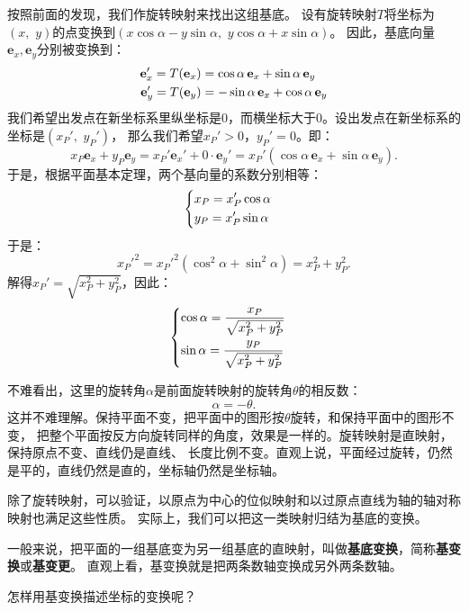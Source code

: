 \documentclass[12pt,UTF8]{ctexbook}
\begin{document}
按照前面的发现，我们作旋转映射来找出这组基底。
设有旋转映射$T$将坐标为$(x,\,\, y)$的点变换到$(x\cos{\alpha} - y\sin{\alpha},\,\,y\cos{\alpha} + x\sin{\alpha})$。
因此，基底向量$\mathbf{e}_x, \mathbf{e}_y$分别被变换到：
\begin{align}
    \mathbf{e}_x' = T(\mathbf{e}_x) &= \cos{\alpha}\,\mathbf{e}_x + \sin{\alpha}\,\mathbf{e}_y \notag \\
    \mathbf{e}_y' = T(\mathbf{e}_y) &= -\sin{\alpha}\,\mathbf{e}_x + \cos{\alpha}\,\mathbf{e}_y \notag 
\end{align}
我们希望出发点在新坐标系里纵坐标是$0$，而横坐标大于$0$。设出发点在新坐标系的坐标是$(x_P', \,\, y_P')$，
那么我们希望$x_P' > 0$，$y_P' = 0$。即：
$$ x_P\mathbf{e}_x + y_P\mathbf{e}_y = x_P' \mathbf{e}_x' + 0 \cdot \mathbf{e}_y' = x_P' (\cos{\alpha}\,\mathbf{e}_x + \sin{\alpha}\,\mathbf{e}_y). $$
于是，根据平面基本定理，两个基向量的系数分别相等：
\begin{alignat*}{1}
&   \begin{dcases}
        x_P = x_P' \cos{\alpha} \\
        y_P = x_P' \sin{\alpha} 
    \end{dcases}
\end{alignat*}
于是：
$$ x_P'^2 = x_P'^2 (\cos^2{\alpha} + \sin^2{\alpha}) = x_P^2 + y_P^2. $$
解得$x_P' = \sqrt{x_P^2 + y_P^2}$，因此：
\begin{alignat*}{1}
&   \begin{dcases}
        \cos{\alpha} = \frac{x_P}{\sqrt{x_P^2 + y_P^2}} \\
        \sin{\alpha} = \frac{y_P}{\sqrt{x_P^2 + y_P^2}} 
    \end{dcases}
\end{alignat*}

不难看出，这里的旋转角$\alpha$是前面旋转映射的旋转角$\theta$的相反数：
$$ \alpha = -\theta.$$
这并不难理解。保持平面不变，把平面中的图形按$\theta$旋转，和保持平面中的图形不变，
把整个平面按反方向旋转同样的角度，效果是一样的。旋转映射是直映射，保持原点不变、直线仍是直线、
长度比例不变。直观上说，平面经过旋转，仍然是平的，直线仍然是直的，坐标轴仍然是坐标轴。

除了旋转映射，可以验证，以原点为中心的位似映射和以过原点直线为轴的轴对称映射也满足这些性质。
实际上，我们可以把这一类映射归结为基底的变换。

一般来说，把平面的一组基底变为另一组基底的直映射，叫做\textbf{基底变换}，简称\textbf{基变换}或\textbf{基变更}。
直观上看，基变换就是把两条数轴变换成另外两条数轴。

怎样用基变换描述坐标的变换呢？
\end{document}
